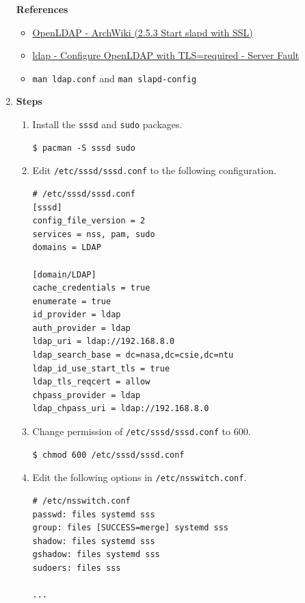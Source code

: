 \documentclass[12pt, a4paper]{article}
\begin{document}
\begin{enumerate}[label=(\alph*)]
    \pagebreak
    \textbf{References}
    \begin{itemize}
      \item \href{https://wiki.archlinux.org/title/openLDAP#Start_slapd_with_SSL}{OpenLDAP - ArchWiki (2.5.3 Start slapd with SSL)}
      \item \href{https://serverfault.com/questions/459718/configure-openldap-with-tls-required}{ldap - Configure OpenLDAP with TLS=required - Server Fault}
      \item \verb|man ldap.conf| and \verb|man slapd-config|
    \end{itemize}

    \item \textbf{Steps}
    \begin{enumerate}[label=(\arabic*)]
      \item Install the \verb|sssd| and \verb|sudo| packages.
      \begin{Verbatim}[frame=single]
$ pacman -S sssd sudo
      \end{Verbatim}

      \item Edit \verb|/etc/sssd/sssd.conf| to the following configuration.
      \begin{Verbatim}[frame=single, fontsize=\footnotesize]
# /etc/sssd/sssd.conf
[sssd]
config_file_version = 2
services = nss, pam, sudo
domains = LDAP

[domain/LDAP]
cache_credentials = true
enumerate = true
id_provider = ldap
auth_provider = ldap
ldap_uri = ldap://192.168.8.0
ldap_search_base = dc=nasa,dc=csie,dc=ntu
ldap_id_use_start_tls = true
ldap_tls_reqcert = allow
chpass_provider = ldap
ldap_chpass_uri = ldap://192.168.8.0
      \end{Verbatim}
      \item Change permission of \verb|/etc/sssd/sssd.conf| to 600.
      \begin{Verbatim}[frame=single]
$ chmod 600 /etc/sssd/sssd.conf
      \end{Verbatim}

      \item Edit the following options in \verb|/etc/nsswitch.conf|.
      \begin{Verbatim}[frame=single, fontsize=\footnotesize]
# /etc/nsswitch.conf
passwd: files systemd sss
group: files [SUCCESS=merge] systemd sss
shadow: files systemd sss
gshadow: files systemd sss
sudoers: files sss

...
      \end{Verbatim}


\end{enumerate}
\end{enumerate}
\end{document}
